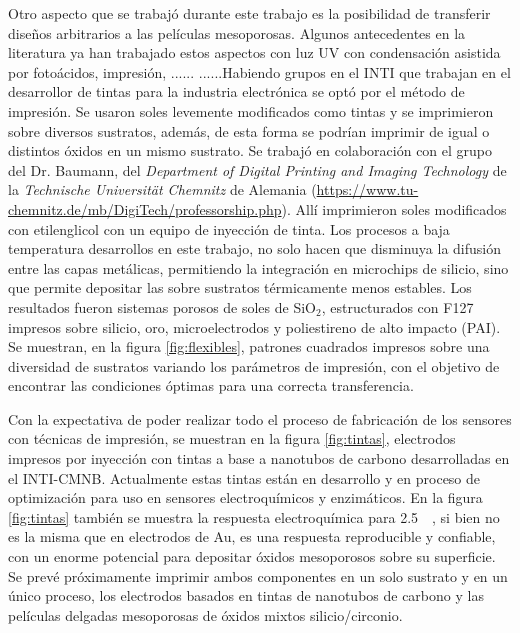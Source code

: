  	  Otro aspecto que se trabajó durante este trabajo es la posibilidad de transferir diseños arbitrarios a las películas mesoporosas. Algunos antecedentes en la literatura ya han trabajado estos aspectos con luz UV con condensación asistida por fotoácidos, impresión, ...... ......Habiendo grupos en el INTI que trabajan en el desarrollor de tintas para la industria electrónica se optó por el método de impresión. Se usaron soles levemente modificados como tintas y se imprimieron sobre diversos sustratos, además, de esta forma se podrían imprimir \pdm\space de igual o distintos óxidos en un mismo sustrato. Se trabajó en colaboración con el grupo del Dr. Baumann, del \textit{Department of Digital Printing and Imaging Technology} de la \textit{Technische Universität Chemnitz} de Alemania (\url{https://www.tu-chemnitz.de/mb/DigiTech/professorship.php}). Allí imprimieron soles modificados con etilenglicol con un equipo de inyección de tinta. Los procesos a baja temperatura desarrollos en este trabajo, no solo hacen que disminuya la difusión entre las capas metálicas, permitiendo la integración en microchips de silicio, sino que permite depositar las \pdm\space sobre sustratos térmicamente menos estables. Los resultados fueron sistemas porosos de soles de SiO$_2$, estructurados con F127 impresos sobre silicio, oro, microelectrodos y poliestireno de alto impacto (PAI). Se muestran, en la figura \ref{fig:flexibles}, patrones cuadrados impresos sobre una diversidad de sustratos variando los parámetros de impresión, con el objetivo de encontrar las condiciones óptimas para una correcta transferencia.


 	  Con la expectativa de poder realizar todo el proceso de fabricación de los sensores con técnicas de impresión, se muestran en la figura \ref{fig:tintas}, electrodos impresos por inyección con tintas a base a nanotubos de carbono desarrolladas en el INTI-CMNB. Actualmente estas tintas están en desarrollo y en proceso de optimización para uso en sensores electroquímicos y enzimáticos\cite{longinotti2010,Mass2016}. En la figura \ref{fig:tintas} también se muestra la respuesta electroquímica para \fe\space \SI{2.5}{\milli\Molar}, si bien no es la misma que en electrodos de Au, es una respuesta reproducible y confiable, con un enorme potencial para depositar óxidos mesoporosos sobre su superficie. Se prevé próximamente imprimir ambos componentes en un solo sustrato y en un único proceso, los electrodos basados en tintas de nanotubos de carbono y las películas delgadas mesoporosas de óxidos mixtos silicio/circonio.

